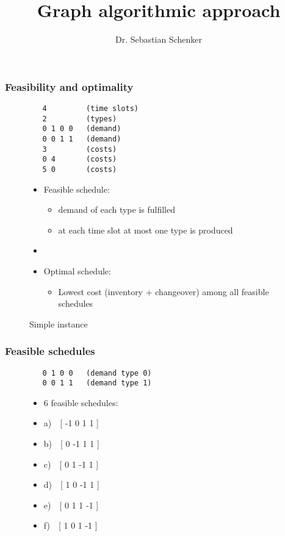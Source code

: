 \documentclass{beamer}
\title{Graph algorithmic approach}
\author{Dr. Sebastian Schenker}
\date{}
\begin{document}
\frame{\titlepage}

\begin{frame}[fragile]
  \frametitle{Feasibility and optimality}
  \begin{figure}
    \begin{minipage}{0.45\textwidth}
          \caption{Simple instance}
\begin{verbatim}
   4         (time slots)
   2         (types)
   0 1 0 0   (demand)
   0 0 1 1   (demand)
   3         (costs)
   0 4       (costs)
   5 0       (costs)
\end{verbatim}
    \end{minipage}
    \hfill
    \begin{minipage}{0.45\textwidth}
      \begin{itemize}
    \item Feasible schedule:
      \begin{itemize}
      \item demand of each type is fulfilled
      \item at each time slot at most one type is produced
      \end{itemize}
    \item[]
    \item Optimal schedule:
      \begin{itemize}
      \item Lowest cost (inventory + changeover) among all
        feasible schedules
      \end{itemize}
    \end{itemize}
  \end{minipage}
\end{figure}
\end{frame}

\begin{frame}[fragile]
  \frametitle{Feasible schedules}
  \begin{figure}
    \begin{minipage}{0.45\textwidth}
\begin{verbatim}
   0 1 0 0   (demand type 0)
   0 0 1 1   (demand type 1)
\end{verbatim}
    \end{minipage}
    \hfill
    \begin{minipage}{0.45\textwidth}
      \begin{itemize}
      \item 6 feasible schedules:
      \item[] a)~~[ -1 0 1 1 ]
      \item[] b)~~[ 0 -1 1 1 ]
      \item[] c)~~[ 0 1 -1 1 ]
      \item[] d)~~[ 1 0 -1 1 ]
      \item[] e)~~[ 0 1 1 -1 ]
      \item[] f)~~[ 1 0 1 -1 ]
      \end{itemize}
    \end{minipage}
  \end{figure}
\end{frame}
\end{document}
